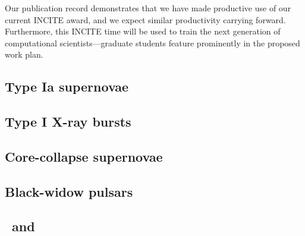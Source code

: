 \documentclass[11pt,letterpaper,english]{article}
\begin{document}
Our publication record demonstrates that we have made productive use
of our current INCITE award, and we expect similar productivity
carrying forward.  Furthermore, this INCITE time will be used to train
the next generation of computational scientists---graduate students
feature prominently in the proposed work plan.


\subsection{Type Ia supernovae}




\subsection{Type I X-ray bursts}




\subsection{Core-collapse supernovae}




\subsection{Black-widow pulsars}




\subsection{\maestro\ and \castro}
\end{document}
